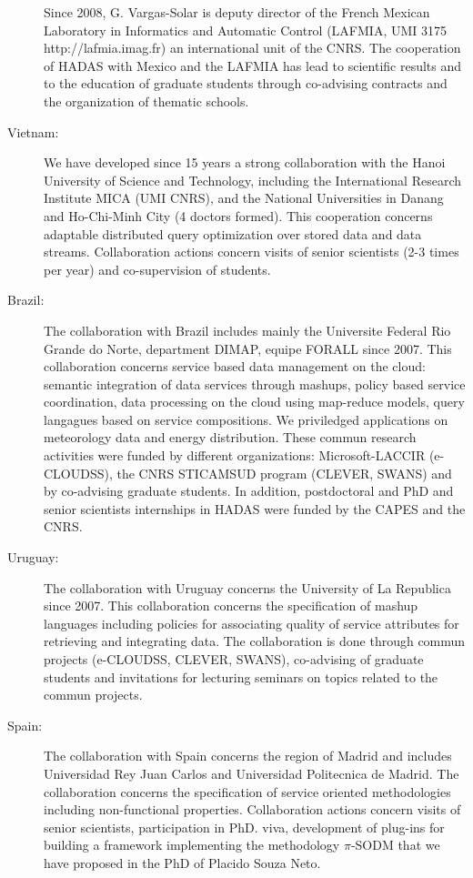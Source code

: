 \begin{description}
Since 2008, G. Vargas-Solar is deputy director of the French Mexican Laboratory in Informatics and Automatic Control (LAFMIA, UMI 3175 http://lafmia.imag.fr) an international unit of the CNRS. 
The cooperation of HADAS with Mexico and the LAFMIA has lead to scientific results and to the education of graduate students through co-advising contracts and the organization of thematic schools. 

\item[Vietnam:] We have developed since 15 years a strong collaboration with the Hanoi University of Science and Technology, including the International Research Institute MICA (UMI CNRS), and the National Universities in Danang and Ho-Chi-Minh City (4 doctors formed). This cooperation concerns adaptable distributed query optimization over stored data and data streams. Collaboration actions concern visits of senior scientists (2-3 times per year) and co-supervision of students.

\item[Brazil:] 
The collaboration with Brazil includes mainly the Universite Federal Rio Grande do Norte, department DIMAP,  equipe FORALL since 2007. This collaboration concerns service based data management on the cloud: semantic integration of data services through mashups, policy based service coordination, data processing on the cloud using map-reduce models, query langagues based on service compositions.  We priviledged applications on meteorology data and energy distribution. These commun research activities were funded by different organizations: 
Microsoft-LACCIR (e-CLOUDSS), the CNRS STICAMSUD program (CLEVER, SWANS) and by co-advising graduate students. In addition, postdoctoral and PhD and senior scientists internships in HADAS were funded by the CAPES and the CNRS.   

\item[Uruguay:] 
The collaboration with Uruguay concerns the University of La Republica since 2007. This collaboration concerns the specification of mashup languages including policies for associating quality of service attributes for retrieving and integrating data. The collaboration is done through commun projects (e-CLOUDSS, CLEVER, SWANS), co-advising of graduate students and invitations for lecturing seminars on topics related to the commun projects.

\item[Spain:] 
The collaboration with Spain concerns the region of Madrid and includes Universidad Rey Juan Carlos and Universidad Politecnica de Madrid. The collaboration concerns the specification of service oriented methodologies including non-functional properties. Collaboration actions concern visits of senior scientists, participation in PhD. viva, development of plug-ins for building a framework implementing the methodology $\pi$-SODM that we have proposed in the PhD of Placido Souza Neto. 


\end{description}
